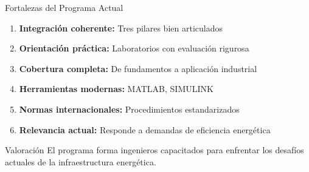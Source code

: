 \documentclass[aspectratio=43]{beamer}
\begin{document}
  \begin{frame}{Fortalezas del Programa Actual}
  \begin{enumerate}
  \item \textbf{Integración coherente:} Tres pilares bien articulados
  \item \textbf{Orientación práctica:} Laboratorios con evaluación rigurosa
  \item \textbf{Cobertura completa:} De fundamentos a aplicación industrial
  \item \textbf{Herramientas modernas:} MATLAB, SIMULINK
  \item \textbf{Normas internacionales:} Procedimientos estandarizados
  \item \textbf{Relevancia actual:} Responde a demandas de eficiencia energética
  \end{enumerate}
  
  \vspace{0.3cm}
  
  \begin{exampleblock}{Valoración}
  El programa forma ingenieros capacitados para enfrentar los desafíos actuales de la infraestructura energética.
  \end{exampleblock}
  
  \end{frame}
  
\end{document}

